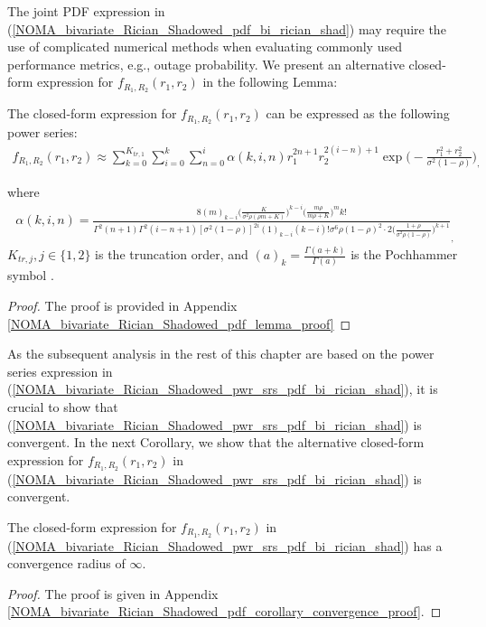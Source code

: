 The joint PDF expression in (\ref{NOMA_bivariate_Rician_Shadowed_pdf_bi_rician_shad}) may require the use of complicated numerical methods when evaluating commonly used performance metrics, e.g., outage probability. We present an alternative closed-form expression for $f_{R_1,R_2}(r_1,r_2)$ in the following Lemma:
\begin{lemma} \label{NOMA_bivariate_Rician_Shadowed_lemma_pwr_srs_pdf_bi_rician_shad}
The closed-form expression for $f_{R_1,R_2}(r_1,r_2)$ can be expressed as the following power series:
\begin{eqnarray} \label{NOMA_bivariate_Rician_Shadowed_pwr_srs_pdf_bi_rician_shad}
f_{R_1,R_2}(r_1,r_2) \approx \sum_{k=0}^{K_{tr,1}} \sum_{i=0}^{k} \sum_{n=0}^{i} \alpha(k,i,n) r_1^{2n+1} r_2^{2(i-n)+1} \exp\bigg( -\frac{r_1^2 + r_2^2}{\sigma^2 (1-\rho)} \bigg)_,
\end{eqnarray}
\end{lemma}
where 
\begin{eqnarray}
\alpha(k,i,n) = \frac{8(m)_{k-i}\big( \frac{K}{\sigma^2 \rho (\rho m + K)} \big)^{k-i} \big(\frac{m\rho}{m\rho+K}\big)^m k!}{\Gamma^2(n+1)\Gamma^2(i-n+1)[\sigma^2 (1-\rho)]^{2i} (1)_{k-i} (k-i)! \sigma^6 \rho (1-\rho)^2 \cdot 2\big(\frac{1+\rho}{\sigma^2 \rho (1-\rho)}\big)^{k+1}}_, \nonumber
\end{eqnarray}
$K_{tr,j},j \in \{1,2\}$ is the truncation order, and $(a)_k=\frac{\Gamma(a+k)}{\Gamma(a)}$ is the Pochhammer symbol \cite[eq. (6.1.22)]{abramowitz1964handbook}.

\begin{proof}
The proof is provided in Appendix \ref{NOMA_bivariate_Rician_Shadowed_pdf_lemma_proof}
\end{proof}

As the subsequent analysis in the rest of this chapter are based on the power series expression in (\ref{NOMA_bivariate_Rician_Shadowed_pwr_srs_pdf_bi_rician_shad}), it is crucial to show that (\ref{NOMA_bivariate_Rician_Shadowed_pwr_srs_pdf_bi_rician_shad}) is convergent. In the next Corollary, we show that the alternative closed-form expression for $f_{R_1,R_2}(r_1,r_2)$ in (\ref{NOMA_bivariate_Rician_Shadowed_pwr_srs_pdf_bi_rician_shad}) is convergent.
\begin{corollary} \label{NOMA_bivariate_Rician_Shadowed_pdf_corollary_convergence}
The closed-form expression for $f_{R_1,R_2}(r_1,r_2)$ in (\ref{NOMA_bivariate_Rician_Shadowed_pwr_srs_pdf_bi_rician_shad}) has a convergence radius of $\infty$. 
\end{corollary}
\begin{proof}
The proof is given in Appendix \ref{NOMA_bivariate_Rician_Shadowed_pdf_corollary_convergence_proof}.
\end{proof}

